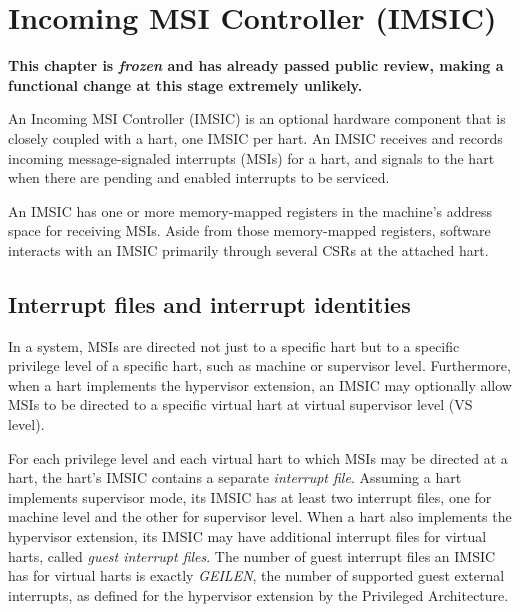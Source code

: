 
\chapter{Incoming MSI Controller (IMSIC)}
\label{ch:IMSIC}

\textbf{%
This chapter is \emph{frozen} and has already passed public review,
making a functional change at this stage extremely unlikely.%
}
\bigskip

An Incoming MSI Controller (IMSIC) is an optional {\RISCV} hardware
component that is closely coupled with a hart, one IMSIC per hart.
An IMSIC receives and records incoming message-signaled interrupts
(MSIs) for a hart, and signals to the hart when there are pending and
enabled interrupts to be serviced.

An IMSIC has one or more memory-mapped registers in the machine's
address space for receiving MSIs.
Aside from those memory-mapped registers, software interacts with an
IMSIC primarily through several {\RISCV} CSRs at the attached hart.

\section{Interrupt files and interrupt identities}
\label{sec:IMSIC-intrFilesAndIdents}

In a {\RISCV} system, MSIs are directed not just to a specific hart but
to a specific privilege level of a specific hart, such as machine or
supervisor level.
Furthermore, when a hart implements the hypervisor extension, an IMSIC
may optionally allow MSIs to be directed to a specific virtual hart at
virtual supervisor level (VS level).

For each privilege level and each virtual hart to which MSIs
may be directed at a hart, the hart's IMSIC contains a separate
\emph{interrupt file}.
Assuming a hart implements supervisor mode, its IMSIC has at least two
interrupt files, one for machine level and the other for supervisor
level.
When a hart also implements the hypervisor extension, its IMSIC may
have additional interrupt files for virtual harts,
called \emph{guest interrupt files}.
The number of guest interrupt files an IMSIC has for virtual harts is exactly
\emph{GEILEN}, the number of supported guest external interrupts,
as defined for the hypervisor extension
by the {\RISCV} Privileged Architecture.

